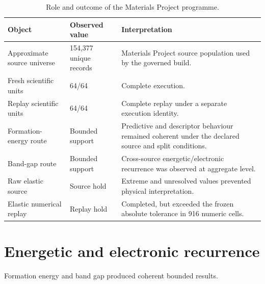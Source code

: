 \documentclass[11pt,a4paper,oneside]{report}
\begin{document}
\begin{table}[H]



\centering



\caption{Role and outcome of the Materials Project programme.}



\label{tab:mp-programme-summary}



\begin{tabularx}{\textwidth}{L{0.29\textwidth}
    L{0.22\textwidth}
    Y
}
\toprule
\textbf{Object}
&
\textbf{Observed value}
&
\textbf{Interpretation}
\\
\midrule
Approximate source universe
&
154,377 unique records
&
Materials Project source population used by the governed build.
\\
\addlinespace
Fresh scientific units
&
64/64
&
Complete execution.
\\
\addlinespace
Replay scientific units
&
64/64
&
Complete replay under a separate execution identity.
\\
\addlinespace
Formation-energy route
&
Bounded support
&
Predictive and descriptor behaviour remained coherent under the
declared source and split conditions.
\\
\addlinespace
Band-gap route
&
Bounded support
&
Cross-source energetic/electronic recurrence was observed at aggregate
level.
\\
\addlinespace
Raw elastic source
&
Source hold
&
Extreme and unresolved values prevented physical interpretation.
\\
\addlinespace
Elastic numerical replay
&
Replay hold
&
Completed,
but exceeded the frozen absolute tolerance in 916 numeric cells.
\\
\bottomrule
\end{tabularx}



\end{table}





\section{Energetic and electronic recurrence}



Formation energy and band gap produced coherent bounded results.
\end{document}
